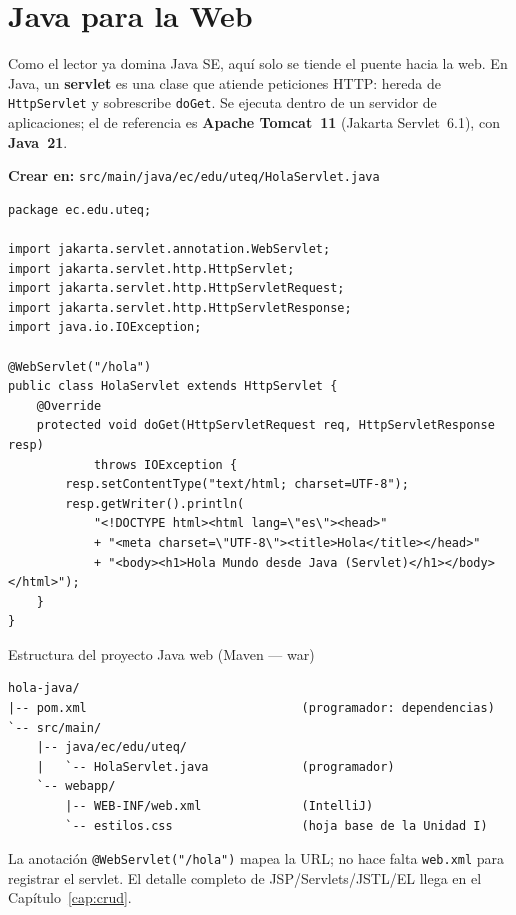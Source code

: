 \section{Java para la Web}
\label{sec:cap5:javaweb}

Como el lector ya domina Java SE, aquí solo se tiende el puente hacia la
web. En Java, un \textbf{servlet} es una clase que atiende peticiones
HTTP: hereda de \texttt{HttpServlet} y sobrescribe \texttt{doGet}. Se
ejecuta dentro de un servidor de aplicaciones; el de referencia es
\textbf{Apache Tomcat~11} (Jakarta Servlet~6.1), con \textbf{Java~21}.

{\small\textbf{Crear en:} \texttt{src/main/java/ec/edu/uteq/HolaServlet.java}}
\begin{lstlisting}[style=java,caption={HolaServlet.java --- Hola Mundo en Java web},label={lst:c5-java-hola}]
package ec.edu.uteq;

import jakarta.servlet.annotation.WebServlet;
import jakarta.servlet.http.HttpServlet;
import jakarta.servlet.http.HttpServletRequest;
import jakarta.servlet.http.HttpServletResponse;
import java.io.IOException;

@WebServlet("/hola")
public class HolaServlet extends HttpServlet {
    @Override
    protected void doGet(HttpServletRequest req, HttpServletResponse resp)
            throws IOException {
        resp.setContentType("text/html; charset=UTF-8");
        resp.getWriter().println(
            "<!DOCTYPE html><html lang=\"es\"><head>"
            + "<meta charset=\"UTF-8\"><title>Hola</title></head>"
            + "<body><h1>Hola Mundo desde Java (Servlet)</h1></body></html>");
    }
}
\end{lstlisting}

\begin{cajaejemplo}{Estructura del proyecto Java web (Maven --- war)}
\begin{lstlisting}[style=shell,caption={Estructura minima de un proyecto Java web},label={lst:c5-java-tree}]
hola-java/
|-- pom.xml                              (programador: dependencias)
`-- src/main/
    |-- java/ec/edu/uteq/
    |   `-- HolaServlet.java             (programador)
    `-- webapp/
        |-- WEB-INF/web.xml              (IntelliJ)
        `-- estilos.css                  (hoja base de la Unidad I)
\end{lstlisting}
\end{cajaejemplo}

La anotación \texttt{@WebServlet("/hola")} mapea la URL; no hace falta
\texttt{web.xml} para registrar el servlet. El detalle completo de
JSP/Servlets/JSTL/EL llega en el Capítulo~\ref{cap:crud}.

